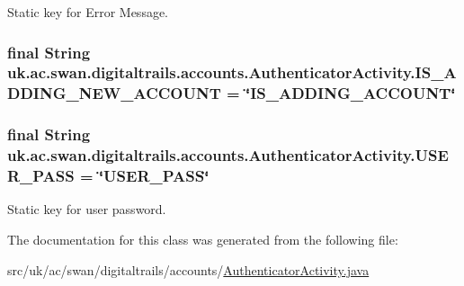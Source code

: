 Static key for Error Message. 

\hypertarget{classuk_1_1ac_1_1swan_1_1digitaltrails_1_1accounts_1_1_authenticator_activity_a38e8ab4c5aca243cf82cccffff9871a7}{
\subsubsection[{I\+S\+\_\+\+A\+D\+D\+I\+N\+G\+\_\+\+N\+E\+W\+\_\+\+A\+C\+C\+O\+U\+N\+T}]{\setlength{\rightskip}{0pt plus 5cm}final String uk.\+ac.\+swan.\+digitaltrails.\+accounts.\+Authenticator\+Activity.\+I\+S\+\_\+\+A\+D\+D\+I\+N\+G\+\_\+\+N\+E\+W\+\_\+\+A\+C\+C\+O\+U\+N\+T = \char`\"{}I\+S\+\_\+\+A\+D\+D\+I\+N\+G\+\_\+\+A\+C\+C\+O\+U\+N\+T\char`\"{}\hspace{0.3cm}{\ttfamily [static]}}}\label{classuk_1_1ac_1_1swan_1_1digitaltrails_1_1accounts_1_1_authenticator_activity_a38e8ab4c5aca243cf82cccffff9871a7}
\hypertarget{classuk_1_1ac_1_1swan_1_1digitaltrails_1_1accounts_1_1_authenticator_activity_a8ea4980e7fab8bd02125c9a36bbe4b2d}{
\subsubsection[{U\+S\+E\+R\+\_\+\+P\+A\+S\+S}]{\setlength{\rightskip}{0pt plus 5cm}final String uk.\+ac.\+swan.\+digitaltrails.\+accounts.\+Authenticator\+Activity.\+U\+S\+E\+R\+\_\+\+P\+A\+S\+S = \char`\"{}U\+S\+E\+R\+\_\+\+P\+A\+S\+S\char`\"{}\hspace{0.3cm}{\ttfamily [static]}}}\label{classuk_1_1ac_1_1swan_1_1digitaltrails_1_1accounts_1_1_authenticator_activity_a8ea4980e7fab8bd02125c9a36bbe4b2d}


Static key for user password. 



The documentation for this class was generated from the following file\+:\begin{DoxyCompactItemize}
\item 
src/uk/ac/swan/digitaltrails/accounts/\hyperlink{_authenticator_activity_8java}{Authenticator\+Activity.\+java}\end{DoxyCompactItemize}
